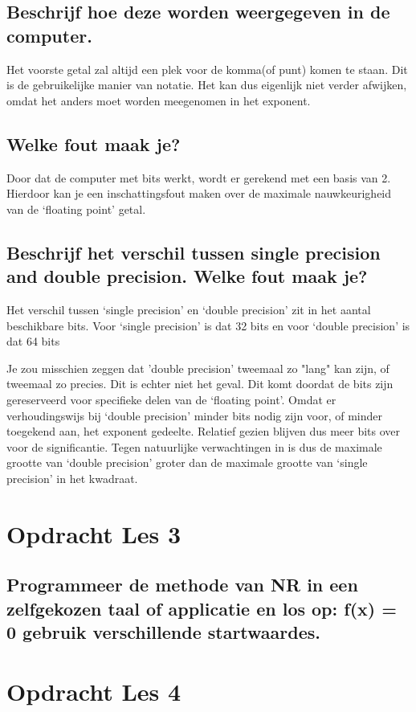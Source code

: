 \documentclass{article}%
\begin{document}
\subsection{\normalsize{Beschrijf hoe deze worden weergegeven in de computer.}}
Het voorste getal zal altijd een plek voor de komma(of punt) komen te staan. Dit is de gebruikelijke manier van notatie. Het kan dus eigenlijk niet verder afwijken, omdat het anders moet worden meegenomen in het exponent.

\subsection{\normalsize{Welke fout maak je?}}
Door dat de computer met bits werkt, wordt er gerekend met een basis van 2. Hierdoor kan je een inschattingsfout maken over de maximale nauwkeurigheid van de ‘floating point’ getal.

\subsection{\normalsize{Beschrijf het verschil tussen single precision and double precision. Welke fout maak je?}}
Het verschil tussen ‘single precision’ en ‘double precision’ zit in het aantal beschikbare bits. Voor ‘single precision’ is dat 32 bits en voor ‘double precision’ is dat 64 bits

Je zou misschien zeggen dat 'double precision' tweemaal zo "lang" kan zijn, of tweemaal zo precies. Dit is echter niet het geval. Dit komt doordat de bits zijn gereserveerd voor specifieke delen van de ‘floating point’. Omdat er verhoudingswijs bij ‘double precision’ minder bits nodig zijn voor, of minder toegekend aan, het exponent gedeelte. Relatief gezien blijven dus meer bits over voor de significantie. Tegen natuurlijke verwachtingen in is dus de maximale grootte van ‘double precision’ groter dan de maximale grootte van ‘single precision’ in het kwadraat.

\clearpage
\section{Opdracht Les 3}
\subsection{\normalsize{Programmeer de methode van NR in een zelfgekozen taal of applicatie en los op: f(x) = 0 gebruik verschillende startwaardes.}}

\section{Opdracht Les 4}
\end{document}
